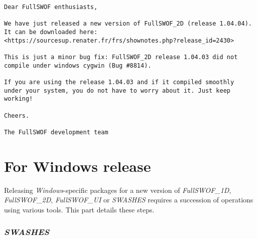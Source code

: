 \documentclass[a4paper, 11pt]{article}
\newcommand{\FullSWOFoneD}{\emph{FullSWOF\_1D}}
\newcommand{\FullSWOFtwoD}{\emph{FullSWOF\_2D}}
\newcommand{\FullSWOFUI}{\emph{FullSWOF\_UI}}
\newcommand{\SWASHES}{\emph{SWASHES}}
\begin{document}
\begin{enumerate}
\begin{verbatim}
Dear FullSWOF enthusiasts,

We have just released a new version of FullSWOF_2D (release 1.04.04).
It can be downloaded here:
<https://sourcesup.renater.fr/frs/shownotes.php?release_id=2430>

This is just a minor bug fix: FullSWOF_2D release 1.04.03 did not
compile under windows cygwin (Bug #8814).

If you are using the release 1.04.03 and if it compiled smoothly
under your system, you do not have to worry about it. Just keep working!

Cheers.

The FullSWOF development team 
\end{verbatim}
\end{enumerate}

\part{For Windows release}
\setcounter{section}{0}

Releasing \emph{Windows}-specific packages for a new version of \FullSWOFoneD, \FullSWOFtwoD{}, \FullSWOFUI{} or \SWASHES{} requires a succession of operations using various tools. 
This part details these steps.


\section{\SWASHES{}}
\end{document}
